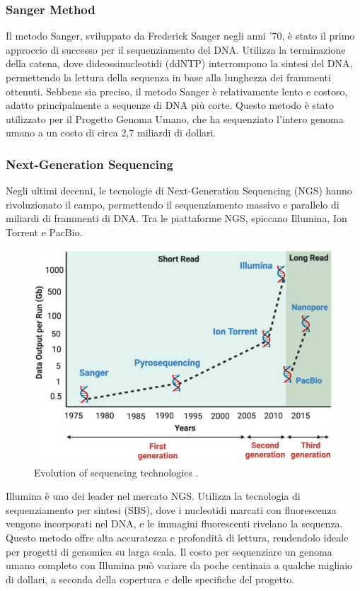 	\subsubsection{Sanger Method}
	Il metodo Sanger, sviluppato da Frederick Sanger negli anni '70, è stato il primo approccio di successo per il sequenziamento del DNA. Utilizza la terminazione della catena, dove dideossinucleotidi (ddNTP) interrompono la sintesi del DNA, permettendo la lettura della sequenza in base alla lunghezza dei frammenti ottenuti. Sebbene sia preciso, il metodo Sanger è relativamente lento e costoso, adatto principalmente a sequenze di DNA più corte. Questo metodo è stato utilizzato per il Progetto Genoma Umano, che ha sequenziato l'intero genoma umano a un costo di circa 2,7 miliardi di dollari.
	
	\subsubsection{Next-Generation Sequencing}
	Negli ultimi decenni, le tecnologie di Next-Generation Sequencing (NGS) hanno rivoluzionato il campo, permettendo il sequenziamento massivo e parallelo di miliardi di frammenti di DNA. Tra le piattaforme NGS, spiccano Illumina, Ion Torrent e PacBio.
	
	\begin{figure}[!ht]
		\centering
		\includegraphics[width=0.85\linewidth]{images/next-generation_sequencing_technology}
		\caption{Evolution of sequencing technologies \cite{ngs-technologies}.}
		\label{fig:evolution-sequencing-technologies}
	\end{figure}
	

	Illumina è uno dei leader nel mercato NGS. Utilizza la tecnologia di sequenziamento per sintesi (SBS), dove i nucleotidi marcati con fluorescenza vengono incorporati nel DNA, e le immagini fluorescenti rivelano la sequenza. Questo metodo offre alta accuratezza e profondità di lettura, rendendolo ideale per progetti di genomica su larga scala. Il costo per sequenziare un genoma umano completo con Illumina può variare da poche centinaia a qualche migliaio di dollari, a seconda della copertura e delle specifiche del progetto.
	
